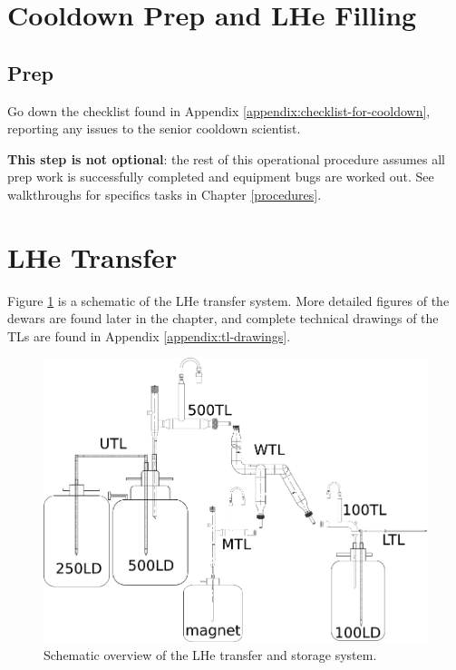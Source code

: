 \readsafetychapterfirst{}

\section{Cooldown Prep and LHe Filling}
\subsection{Prep}
\label{practical-op:prep}
Go down the checklist found in Appendix \ref{appendix:checklist-for-cooldown}, reporting any issues to the senior cooldown scientist.

\textbf{This step is not optional}: the rest of this operational procedure assumes all prep work is successfully completed and equipment bugs are worked out.  See walkthroughs for specifics tasks in Chapter \ref{procedures}.

\section{LHe Transfer}

Figure \ref{fig:cryo-schematic-all} is a schematic of the LHe transfer system.  More detailed figures of the dewars are found later in the chapter, and complete technical drawings of the TLs are found in Appendix \ref{appendix:tl-drawings}.

\begin{figure}[htbp!]
 \centering
 \includegraphics[width=\textwidth]{./img/cryo-schematic-all.png}
 \caption{Schematic overview of the LHe transfer and storage system.}
 \label{fig:cryo-schematic-all}
\end{figure}

